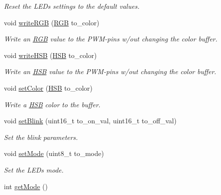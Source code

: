 \begin{DoxyCompactItemize}
\begin{DoxyCompactList}\small\item\em Reset the L\-E\-Ds settings to the default values. \end{DoxyCompactList}\item 
\hypertarget{class_l_e_d_aa3bf077975179fd49b460d89b3c1f0c2}{void \hyperlink{class_l_e_d_aa3bf077975179fd49b460d89b3c1f0c2}{write\-R\-G\-B} (\hyperlink{struct_r_g_b}{R\-G\-B} to\-\_\-color)}\label{class_l_e_d_aa3bf077975179fd49b460d89b3c1f0c2}

\begin{DoxyCompactList}\small\item\em Write an \hyperlink{struct_r_g_b}{R\-G\-B} value to the P\-W\-M-\/pins w/out changing the color buffer. \end{DoxyCompactList}\item 
void \hyperlink{class_l_e_d_a37b525137e042701600812569a0c717b}{write\-H\-S\-B} (\hyperlink{struct_h_s_b}{H\-S\-B} to\-\_\-color)
\begin{DoxyCompactList}\small\item\em Write an \hyperlink{struct_h_s_b}{H\-S\-B} value to the P\-W\-M-\/pins w/out changing the color buffer. \end{DoxyCompactList}\item 
void \hyperlink{class_l_e_d_a6ff49d145e12d6218422fe43d42e88e7}{set\-Color} (\hyperlink{struct_h_s_b}{H\-S\-B} to\-\_\-color)
\begin{DoxyCompactList}\small\item\em Write a \hyperlink{struct_h_s_b}{H\-S\-B} color to the buffer. \end{DoxyCompactList}\item 
void \hyperlink{class_l_e_d_a9cc7250c92975b509d2376dc0c6437b2}{set\-Blink} (uint16\-\_\-t to\-\_\-on\-\_\-val, uint16\-\_\-t to\-\_\-off\-\_\-val)
\begin{DoxyCompactList}\small\item\em Set the blink parameters. \end{DoxyCompactList}\item 
void \hyperlink{class_l_e_d_a979363ee92229d89f91fd5d1af2578f0}{set\-Mode} (uint8\-\_\-t to\-\_\-mode)
\begin{DoxyCompactList}\small\item\em Set the L\-E\-Ds mode. \end{DoxyCompactList}\item 
\hypertarget{class_l_e_d_a70bdd2f0a573be5b78d941edde83a37e}{int \hyperlink{class_l_e_d_a70bdd2f0a573be5b78d941edde83a37e}{get\-Mode} ()}\label{class_l_e_d_a70bdd2f0a573be5b78d941edde83a37e}


\end{DoxyCompactItemize}
